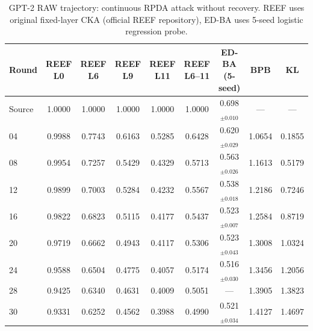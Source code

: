 \begin{table}[t]
\centering
\caption{GPT-2 RAW trajectory: continuous RPDA attack without recovery. REEF uses original fixed-layer CKA (official REEF repository), ED-BA uses 5-seed logistic regression probe.}
\label{tab:gpt2_raw}
\small
\begin{tabular}{lcccccccc}
\toprule
Round & \thead{REEF\\L0} & \thead{REEF\\L6} & \thead{REEF\\L9} & \thead{REEF\\L11} & \thead{REEF\\L6--11} & \thead{ED-BA\\(5-seed)} & BPB & KL \\
\midrule
  Source & 1.0000 & 1.0000 & 1.0000 & 1.0000 & 1.0000 & 0.698$_{\pm0.010}$ & — & — \\
  04 & 0.9988 & 0.7743 & 0.6163 & 0.5285 & 0.6428 & 0.620$_{\pm0.029}$ & 1.0654 & 0.1855 \\
  08 & 0.9954 & 0.7257 & 0.5429 & 0.4329 & 0.5713 & 0.563$_{\pm0.026}$ & 1.1613 & 0.5179 \\
  12 & 0.9899 & 0.7003 & 0.5284 & 0.4232 & 0.5567 & 0.538$_{\pm0.018}$ & 1.2186 & 0.7246 \\
  16 & 0.9822 & 0.6823 & 0.5115 & 0.4177 & 0.5437 & 0.523$_{\pm0.007}$ & 1.2584 & 0.8719 \\
  20 & 0.9719 & 0.6662 & 0.4943 & 0.4117 & 0.5306 & 0.523$_{\pm0.043}$ & 1.3008 & 1.0324 \\
  24 & 0.9588 & 0.6504 & 0.4775 & 0.4057 & 0.5174 & 0.516$_{\pm0.030}$ & 1.3456 & 1.2056 \\
  28 & 0.9425 & 0.6340 & 0.4631 & 0.4009 & 0.5051 & — & 1.3905 & 1.3823 \\
  30 & 0.9331 & 0.6252 & 0.4562 & 0.3988 & 0.4990 & 0.521$_{\pm0.034}$ & 1.4127 & 1.4697 \\
\bottomrule
\end{tabular}
\end{table}
